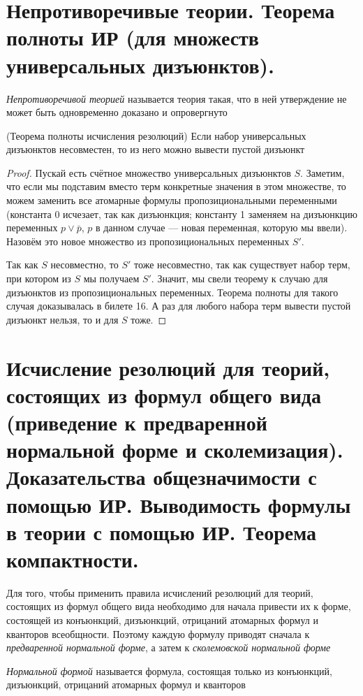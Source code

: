 \documentclass{article}
\begin{document}
\section{Непротиворечивые теории. Теорема полноты ИР (для множеств универсальных дизъюнктов).}
\begin{definition}
	\textit{Непротиворечивой теорией} называется теория такая, что в ней утверждение не может быть одновременно доказано и опровергнуто
\end{definition}

\begin{theorem}{(Теорема полноты исчисления резолюций)}
	Если набор универсальных дизъюнктов несовместен, то из него можно вывести пустой дизъюнкт
\end{theorem}
\begin{proof}
	Пускай есть счётное множество универсальных дизъюнктов $S$. Заметим, что если мы подставим вместо терм конкретные значения в этом множестве, то можем заменить все атомарные формулы пропозициональными переменными (константа 0 исчезает, так как дизъюнкция; константу 1 заменяем на дизъюнкцию переменных $p \vee \bar p$, $p$ в данном случае --- новая переменная, которую мы ввели). Назовём это новое множество из пропозициональных переменных $S'$.
	
	Так как $S$ несовместно, то $S'$ тоже несовместно, так как существует набор терм, при котором из $S$ мы получаем $S'$. Значит, мы свели теорему к случаю для дизъюнктов из пропозициональных переменных. Теорема полноты для такого случая доказывалась в билете 16. А раз для любого набора терм вывести пустой дизъюнкт нельзя, то и для $S$ тоже. 
\end{proof}

\section{Исчисление резолюций для теорий, состоящих из формул общего вида (приведение к предваренной нормальной форме и сколемизация). Доказательства общезначимости с помощью ИР. Выводимость формулы в теории с помощью ИР. Теорема компактности.}
Для того, чтобы применить правила исчислений резолюций для теорий, состоящих из формул общего вида необходимо для начала привести их к форме, состоящей из конъюнкций, дизъюнкций, отрицаний атомарных формул и кванторов всеобщности. Поэтому каждую формулу приводят сначала к \textit{предваренной нормальной форме}, а затем к \textit{сколемовской нормальной форме}

\begin{definition}
	\textit{Нормальной формой} называется формула, состоящая только из конъюнкций, дизъюнкций, отрицаний атомарных формул и кванторов
\end{definition}
\end{document}
